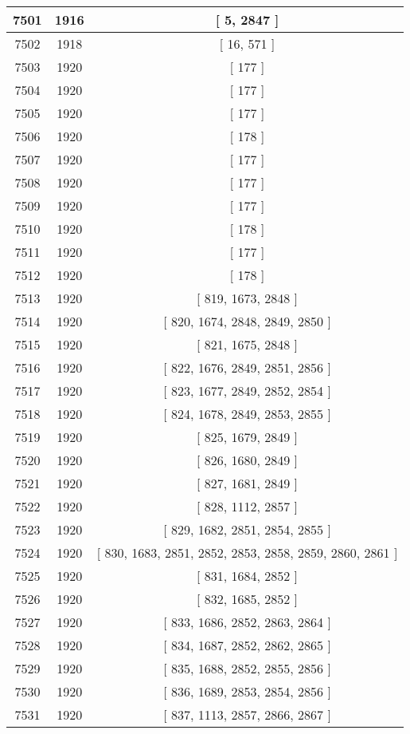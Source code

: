 \begin{center}
\begin{longtable}[H]{|| c c c ||}
\hline
7501 & 1916 & [ 5, 2847 ] \\ 
\hline
7502 & 1918 & [ 16, 571 ] \\ 
\hline
7503 & 1920 & [ 177 ] \\ 
\hline
7504 & 1920 & [ 177 ] \\ 
\hline
7505 & 1920 & [ 177 ] \\ 
\hline
7506 & 1920 & [ 178 ] \\ 
\hline
7507 & 1920 & [ 177 ] \\ 
\hline
7508 & 1920 & [ 177 ] \\ 
\hline
7509 & 1920 & [ 177 ] \\ 
\hline
7510 & 1920 & [ 178 ] \\ 
\hline
7511 & 1920 & [ 177 ] \\ 
\hline
7512 & 1920 & [ 178 ] \\ 
\hline
7513 & 1920 & [ 819, 1673, 2848 ] \\ 
\hline
7514 & 1920 & [ 820, 1674, 2848, 2849, 2850 ] \\ 
\hline
7515 & 1920 & [ 821, 1675, 2848 ] \\ 
\hline
7516 & 1920 & [ 822, 1676, 2849, 2851, 2856 ] \\ 
\hline
7517 & 1920 & [ 823, 1677, 2849, 2852, 2854 ] \\ 
\hline
7518 & 1920 & [ 824, 1678, 2849, 2853, 2855 ] \\ 
\hline
7519 & 1920 & [ 825, 1679, 2849 ] \\ 
\hline
7520 & 1920 & [ 826, 1680, 2849 ] \\ 
\hline
7521 & 1920 & [ 827, 1681, 2849 ] \\ 
\hline
7522 & 1920 & [ 828, 1112, 2857 ] \\ 
\hline
7523 & 1920 & [ 829, 1682, 2851, 2854, 2855 ] \\ 
\hline
7524 & 1920 & [ 830, 1683, 2851, 2852, 2853, 2858, 2859, 2860, 2861 ] \\ 
\hline
7525 & 1920 & [ 831, 1684, 2852 ] \\ 
\hline
7526 & 1920 & [ 832, 1685, 2852 ] \\ 
\hline
7527 & 1920 & [ 833, 1686, 2852, 2863, 2864 ] \\ 
\hline
7528 & 1920 & [ 834, 1687, 2852, 2862, 2865 ] \\ 
\hline
7529 & 1920 & [ 835, 1688, 2852, 2855, 2856 ] \\ 
\hline
7530 & 1920 & [ 836, 1689, 2853, 2854, 2856 ] \\ 
\hline
7531 & 1920 & [ 837, 1113, 2857, 2866, 2867 ] \\ 

\end{longtable}
\end{center}
